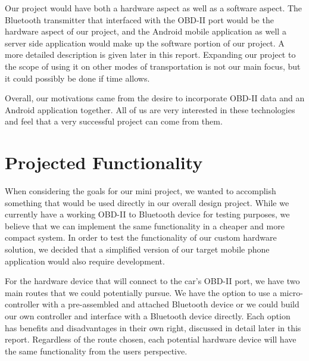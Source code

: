 \documentclass[12pt]{article}
\begin{document}
Our project would have both a hardware aspect as well as a software aspect. The Bluetooth transmitter that interfaced with the OBD-II port would be the hardware aspect of our project, and the Android mobile application as well a server side application would make up the software portion of our project.  A more detailed description is given later in this report.  Expanding our project to the scope of using it on other modes of transportation is not our main focus, but it could possibly be done if time allows.

Overall, our motivations came from the desire to incorporate OBD-II data and an Android application together. All of us are very interested in these technologies and feel that a very successful project can come from them.

\section{Projected Functionality}\label{sec:ProjectedFunctionality}

When considering the goals for our mini project, we wanted to accomplish something that would be used directly in our overall design project.  While we currently have a working OBD-II to Bluetooth device for testing purposes, we believe that we can implement the same functionality in a cheaper and more compact system.  In order to test the functionality of our custom hardware solution, we decided that a simplified version of our target mobile phone application would also require development.

For the hardware device that will connect to the car’s OBD-II port, we have two main routes that we could potentially pursue.  We have the option to use a micro-controller with a pre-assembled and attached Bluetooth device or we could build our own controller and interface with a Bluetooth device directly.  Each option has benefits and disadvantages in their own right, discussed in detail later in this report.  Regardless of the route chosen, each potential hardware device will have the same functionality from the users perspective.
\end{document}
